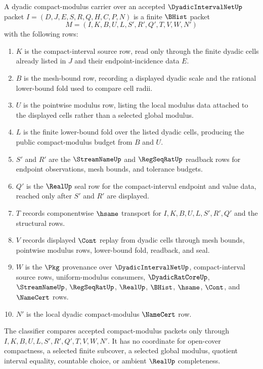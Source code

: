\begin{definition}
\label{def:dyadic-compact-modulus-carrier}
A dyadic compact-modulus carrier over an accepted $\DyadicIntervalNetUp$ packet $I=(D,J,E,S,R,Q,H,C,P,N)$ is a finite $\BHist$ packet
$$
M=(I,K,B,U,L,S',R',Q',T,V,W,N')
$$
with the following rows:
\begin{enumerate}
\item $K$ is the compact-interval source row, read only through the finite dyadic cells already listed in $J$ and their endpoint-incidence data $E$.
\item $B$ is the mesh-bound row, recording a displayed dyadic scale and the rational lower-bound fold used to compare cell radii.
\item $U$ is the pointwise modulus row, listing the local modulus data attached to the displayed cells rather than a selected global modulus.
\item $L$ is the finite lower-bound fold over the listed dyadic cells, producing the public compact-modulus budget from $B$ and $U$.
\item $S'$ and $R'$ are the $\StreamNameUp$ and $\RegSeqRatUp$ readback rows for endpoint observations, mesh bounds, and tolerance budgets.
\item $Q'$ is the $\RealUp$ seal row for the compact-interval endpoint and value data, reached only after $S'$ and $R'$ are displayed.
\item $T$ records componentwise $\hsame$ transport for $I,K,B,U,L,S',R',Q'$ and the structural rows.
\item $V$ records displayed $\Cont$ replay from dyadic cells through mesh bounds, pointwise modulus rows, lower-bound fold, readback, and seal.
\item $W$ is the $\Pkg$ provenance over $\DyadicIntervalNetUp$, compact-interval source rows, uniform-modulus consumers, $\DyadicRatCoreUp$, $\StreamNameUp$, $\RegSeqRatUp$, $\RealUp$, $\BHist$, $\hsame$, $\Cont$, and $\NameCert$ rows.
\item $N'$ is the local dyadic compact-modulus $\NameCert$ row.
\end{enumerate}
The classifier compares accepted compact-modulus packets only through $I,K,B,U,L,S',R',Q',T,V,W,N'$. It has no coordinate for open-cover compactness, a selected finite subcover, a selected global modulus, quotient interval equality, countable choice, or ambient $\RealUp$ completeness.
\end{definition}

